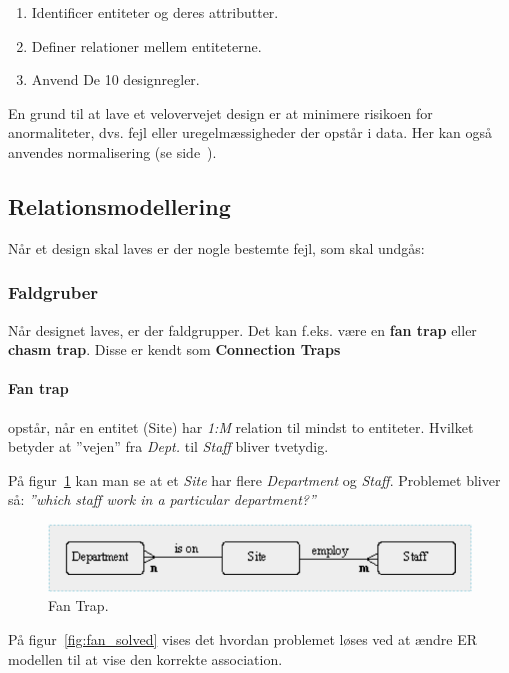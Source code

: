 \begin{enumerate}
	\item Identificer entiteter og deres attributter.
	\item Definer relationer mellem entiteterne.
	\item Anvend De 10 designregler.
\end{enumerate}

En grund til at lave et velovervejet design er at minimere risikoen for anormaliteter, dvs. fejl eller uregelmæssigheder der opstår i data. Her kan også anvendes normalisering (se side~\pageref{sec:normal}).

\subsection{Relationsmodellering}
Når et design skal laves er der nogle bestemte fejl, som skal undgås:

\subsubsection{Faldgruber}
Når designet laves, er der faldgrupper. Det kan f.eks. være en \textbf{fan trap} eller \textbf{chasm trap}. Disse er kendt som \textbf{Connection Traps} 

\paragraph{Fan trap} opstår, når en entitet (Site) har \textit{1:M}  relation til mindst to entiteter. Hvilket betyder at ''vejen'' fra \textit{Dept.} til \textit{Staff} bliver tvetydig. 

På figur~\ref{fig:fan} kan man se at et \textit{Site} har flere \textit{Department} og \textit{Staff}. Problemet bliver så: \textit{''which staff work in a particular department?''}

\begin{figure}[h]
\centering
\includegraphics[width=0.8\linewidth]{figs/spm2/fan}
\caption{Fan Trap.}
\label{fig:fan}
\end{figure}

På figur~\ref{fig:fan_solved} vises det hvordan problemet løses ved at ændre ER modellen til at vise den korrekte association.

